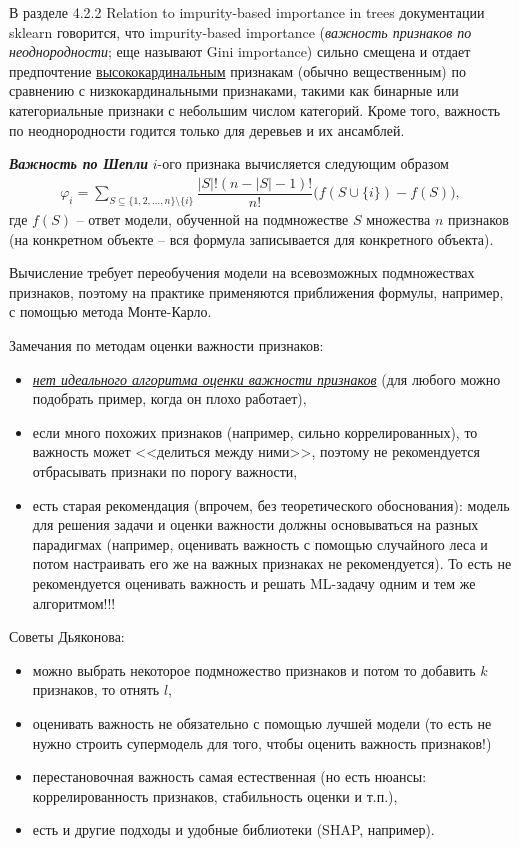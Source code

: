 \documentclass[%
	11pt,
	a4paper,
	utf8,
		]{article}
\begin{document}
В разделе 4.2.2 Relation to impurity-based importance in trees документации sklearn говорится, что impurity-based importance (\emph{важность признаков по неоднородности}; еще называют Gini importance) сильно смещена и отдает предпочтение \underline{высококардинальным} признакам (обычно вещественным) по сравнению с низкокардинальными признаками, такими как бинарные или категориальные признаки с небольшим числом категорий. Кроме того, важность по неоднородности годится только для деревьев и их ансамблей.

\textbf{\emph{Важность по Шепли}} $ i $-ого признака вычисляется следующим образом
\begin{align*}
	\varphi_i = \sum_{S \subseteq \{1, 2, \ldots, n\} \setminus \{i\}} \dfrac{ | S |! (n - |S| - 1)! }{ n! } \big( f(S \cup \{i\}) - f(S) \big),
\end{align*}
где $ f(S) $ -- ответ модели, обученной на подмножестве $ S $ множества $ n $ признаков (на конкретном объекте -- вся формула записывается для конкретного объекта).

Вычисление требует переобучения модели на всевозможных подмножествах признаков, поэтому на практике применяются приближения формулы, например, с помощью метода Монте-Карло.

Замечания по методам оценки важности признаков:
\begin{itemize}
	\item \underline{\itshape нет идеального алгоритма оценки важности признаков} (для любого можно подобрать пример, когда он плохо работает),
	
	\item если много похожих признаков (например, сильно коррелированных), то важность может <<делиться между ними>>, поэтому не рекомендуется отбрасывать признаки по порогу важности,
	
	\item есть старая рекомендация (впрочем, без теоретического обоснования): модель для решения задачи и оценки важности должны основываться на разных парадигмах (например, оценивать важность с помощью случайного леса и потом настраивать его же на важных признаках не рекомендуется). {\color{blue}То есть не рекомендуется оценивать важность и решать ML-задачу одним и тем же алгоритмом!!!}
\end{itemize}

Советы Дьяконова:
\begin{itemize}
	\item можно выбрать некоторое подмножество признаков и потом то добавить $ k $ признаков, то отнять $ l $,
	
	\item оценивать важность не обязательно с помощью лучшей модели (то есть не нужно строить супермодель для того, чтобы оценить важность признаков!)
	
	\item перестановочная важность самая естественная (но есть нюансы: коррелированность признаков, стабильность оценки и т.п.),
	
	\item есть и другие подходы и удобные библиотеки (SHAP, например).
\end{itemize}
\end{document}
